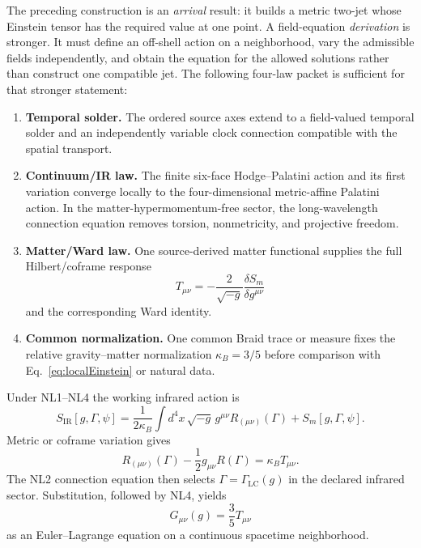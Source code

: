 \documentclass[11pt]{article}
\theoremstyle{definition}
\theoremstyle{remark}
\begin{document}
The preceding construction is an \emph{arrival} result: it builds a metric two-jet whose Einstein tensor has the required value at one point. A field-equation \emph{derivation} is stronger. It must define an off-shell action on a neighborhood, vary the admissible fields independently, and obtain the equation for the allowed solutions rather than construct one compatible jet. The following four-law packet is sufficient for that stronger statement:
\begin{enumerate}[label=\textbf{NL\arabic*.},leftmargin=2.8em]
\item \textbf{Temporal solder.} The ordered source axes extend to a field-valued temporal solder and an independently variable clock connection compatible with the spatial transport.
\item \textbf{Continuum/IR law.} The finite six-face Hodge--Palatini action and its first variation converge locally to the four-dimensional metric-affine Palatini action. In the matter-hypermomentum-free sector, the long-wavelength connection equation removes torsion, nonmetricity, and projective freedom.
\item \textbf{Matter/Ward law.} One source-derived matter functional supplies the full Hilbert/coframe response
\begin{equation}\label{eq:matterstress}
 T_{\mu\nu}=-\frac{2}{\sqrt{-g}}\frac{\delta S_m}{\delta g^{\mu\nu}}
\end{equation}
and the corresponding Ward identity.
\item \textbf{Common normalization.} One common Braid trace or measure fixes the relative gravity--matter normalization $\kappa_B=3/5$ before comparison with Eq.~\eqref{eq:localEinstein} or natural data.
\end{enumerate}

Under NL1--NL4 the working infrared action is
\begin{equation}\label{eq:continuumaction}
 S_{\mathrm{IR}}[g,\Gamma,\psi]
 =\frac{1}{2\kappa_B}\int d^4x\,\sqrt{-g}\,
   g^{\mu\nu}R_{(\mu\nu)}(\Gamma)
 +S_m[g,\Gamma,\psi].
\end{equation}
Metric or coframe variation gives
\begin{equation}\label{eq:metricaffineeuler}
 R_{(\mu\nu)}(\Gamma)-\frac12g_{\mu\nu}R(\Gamma)
 =\kappa_B T_{\mu\nu}.
\end{equation}
The NL2 connection equation then selects $\Gamma=\Gamma_{\mathrm{LC}}(g)$ in the declared infrared sector. Substitution, followed by NL4, yields
\begin{equation}\label{eq:continuumEinstein}
 \boxed{G_{\mu\nu}(g)=\frac35T_{\mu\nu}}
\end{equation}
as an Euler--Lagrange equation on a continuous spacetime neighborhood.
\end{document}
